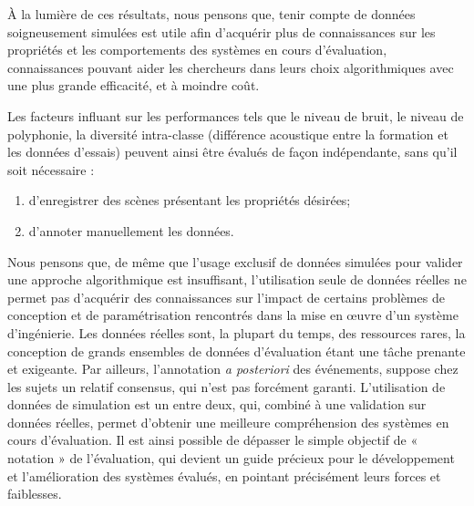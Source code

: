 À la lumière de ces résultats, nous pensons que, tenir compte de données soigneusement simulées est utile afin d'acquérir plus de connaissances sur les propriétés et les comportements des systèmes en cours d'évaluation, connaissances pouvant aider les chercheurs dans leurs choix algorithmiques avec une plus grande efficacité, et à moindre coût.  

Les facteurs influant sur les performances tels que le niveau de bruit, le niveau de polyphonie, la diversité intra-classe (différence acoustique entre la formation et les données d'essais) peuvent ainsi être évalués de façon indépendante, sans qu'il soit nécessaire :

\begin{enumerate}
\item d'enregistrer des scènes présentant les propriétés désirées;
\item d'annoter manuellement les données.
\end{enumerate}

Nous pensons que, de même que l'usage exclusif de données simulées pour valider une approche algorithmique est insuffisant, l'utilisation seule de données réelles ne permet pas d'acquérir des connaissances sur l'impact de certains problèmes de conception et de paramétrisation rencontrés dans la mise en œuvre d'un système d'ingénierie. Les données réelles sont, la plupart du temps, des ressources rares, la conception  de grands ensembles de données d'évaluation étant une tâche prenante et exigeante. Par ailleurs, l'annotation \emph{a posteriori} des événements, suppose chez les sujets un relatif consensus, qui n'est pas forcément garanti. L'utilisation de données de simulation est un entre deux, qui, combiné à une validation sur données réelles, permet d'obtenir une meilleure compréhension des systèmes en cours d'évaluation. Il est ainsi possible de dépasser le simple objectif de « notation » de l'évaluation, qui devient un guide précieux pour le développement et l'amélioration des systèmes évalués, en pointant précisément leurs forces et faiblesses.





